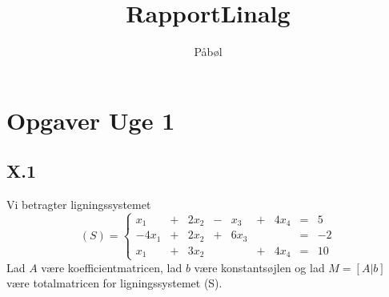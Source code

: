 \documentclass[a4paper,fleqn]{report}
\title{Rapport}
\author{P\aa b\o l}
\title{Linalg}
\begin{document}
	\maketitle
	\newpage
	\setcounter{page}{1}
	\chapter{Opgaver Uge 1}
	\section{X.1}

	Vi betragter ligningssystemet
	\begin{equation}
		(S) = \left\{ \begin{matrix}
				x_1 &+& 2x_2 &-& x_3 &+& 4x_4 &=& 5\\
				-4x_1&+&2x_2 &+&6x_3 & &	   &=& -2\\
				x_1  &+&3x_2 & &&+&4x_4 &=& 10
		\end{matrix} \right.
	\end{equation}
	Lad $A$ være koefficientmatricen, lad $b$ være konstantsøjlen og lad $M = \left[A|b\right]$
	være totalmatricen for ligningssystemet (S).
\end{document}
